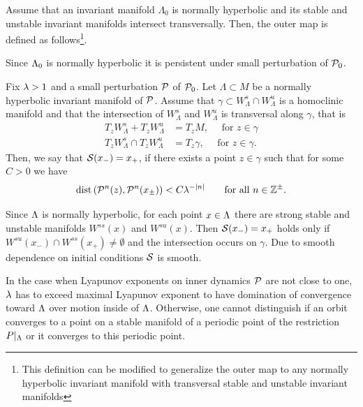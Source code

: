 Assume that an invariant manifold $\Lambda_0$ is normally hyperbolic and its
stable and unstable invariant manifolds intersect transversally. Then,
the outer map is defined as follows\footnote{This definition can be
  modified to generalize the outer map to any normally hyperbolic
  invariant manifold with transversal stable and unstable invariant
  manifolds}.

Since $\Lambda_0$ is normally hyperbolic it is persistent under small 
perturbation of $\mathcal{P}_0$. 

\begin{definition}\label{definition:OuterMap}
Fix $\lambda>1$ and a small perturbation $\mathcal{P}$ of $\mathcal{P}_0$.   
Let $\Lambda\subset M$ be a normally hyperbolic invariant 
manifold of $\mathcal{P}$.  Assume that $\gamma\subset W^s_\Lambda\cap W^u_\Lambda$
is a homoclinic manifold and that the intersection of $W^s_\Lambda$ 
and $W^u_\Lambda$ is transversal along $\gamma$, that is
  \[
  \begin{split}
    T_z W^s_\Lambda+T_z W^u_\Lambda&=T_z M,\quad\text{ for }z\in \gamma\\
    T_z W^s_\Lambda\cap T_z W^u_\Lambda&=T_z\gamma,\quad\text{ for }z\in \gamma.
  \end{split}
  \]
  Then, 
  we say that $\mathcal{S}(x_-)=x_+$, if there exists a point $z\in \gamma$ 
  such that for some $C>0$ we have 
  \[
  \mathrm{dist}\left(\mathcal{P}^n(z),\mathcal{P}^n(x_\pm)\right)< C\lambda^{-|n|}\qquad \text{for all }n\in\mathbb{Z}^\pm.
  \]
\end{definition}
\begin{remark}
Since $\Lambda$ is normally hyperbolic, for each point $x \in \Lambda$ 
there are strong stable and unstable manifolds $W^{ss}(x)$ and 
$W^{su}(x)$. Then $\mathcal{S}(x_-)=x_+$ holds only if $W^{su}(x_-) \cap W^{ss}(x_+)
\ne \emptyset$ and the intersection occurs on $\gamma$.  Due to smooth 
dependence on initial conditions $\mathcal{S}$ is smooth.  

In the case when Lyapunov exponents on inner dynamics $\mathcal{P}$ are not 
close to one, $\lambda$ has to exceed maximal Lyapunov exponent to 
have domination of convergence toward $\Lambda$ over motion inside of $\Lambda$.
Otherwise, one cannot distinguish if an orbit converges to a point on
a stable manifold of a periodic point of the restriction $P|_\Lambda$
or it converges to this periodic point.
\end{remark}


